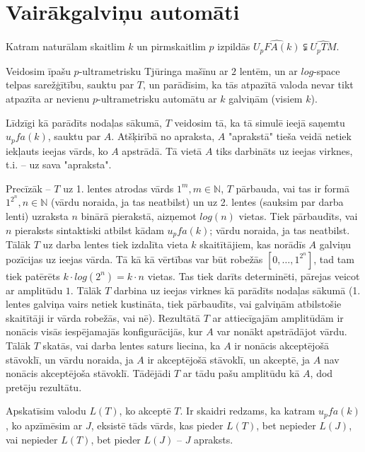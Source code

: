 \documentclass{ludis}
\begin{document}
\section{Vairākgalviņu automāti}
\begin{teorema} \label{atdalisana}
Katram naturālam skaitlim $k$ un pirmskaitlim $p$ izpildās $\widehat{U_pFA(k)} \subsetneqq \widehat{U_pTM}$.
\end{teorema}
\begin{pieradijums}
Veidosim īpašu $p$-ultrametrisku Tjūringa mašīnu ar $2$ lentēm, un ar $log$-space telpas sarežģītību, sauktu par $T$, un parādīsim, ka tās atpazītā valoda nevar tikt atpazīta ar nevienu $p$-ultrametrisku automātu ar $k$ galviņām (visiem $k$).

Līdzīgi kā parādīts nodaļas sākumā, $T$ veidosim tā, ka tā simulē ieejā saņemtu $u_pfa(k)$, sauktu par $A$. Atšķirībā no apraksta, $A$ "aprakstā" tieša veidā netiek iekļauts ieejas vārds, ko $A$ apstrādā. Tā vietā $A$ tiks darbināts uz ieejas virknes, t.i. -- uz sava "apraksta".

Precīzāk -- $T$ uz 1. lentes atrodas vārds $1^m, m \in \mathbb{N}$, $T$ pārbauda, vai tas ir formā $1^{2^n}, n \in \mathbb{N}$ (vārdu noraida, ja tas neatbilst) un uz 2. lentes (sauksim par darba lenti) uzraksta $n$ binārā pierakstā, aizņemot $log(n)$ vietas. Tiek pārbaudīts, vai $n$ pieraksts sintaktiski atbilst kādam $u_pfa(k)$; vārdu noraida, ja tas neatbilst. Tālāk $T$ uz darba lentes tiek izdalīta vieta $k$ skaitītājiem, kas norādīs $A$ galviņu pozīcijas uz ieejas vārda. Tā kā kā vērtības var būt robežās $\left[0, \ldots, 1^{2^n} \right]$, tad tam tiek patērēts $k \cdot log(2^n)= k \cdot n$ vietas. %
Tas tiek darīts determinēti, pārejas veicot ar amplitūdu $1$. Tālāk $T$ darbina uz ieejas virknes kā parādīts nodaļas sākumā (1. lentes galviņa vairs netiek kustināta, tiek pārbaudīts, vai galviņām atbilstošie skaitītāji ir vārda robežās, vai nē). Rezultātā $T$ ar attiecīgajām amplitūdām ir nonācis visās iespējamajās konfigurācijās, kur $A$ var nonākt apstrādājot vārdu. Tālāk $T$ skatās, vai darba lentes saturs liecina, ka $A$ ir nonācis akceptējošā stāvoklī, un vārdu noraida, ja $A$ ir akceptējošā stāvoklī, un akceptē, ja $A$ nav nonācis akceptējoša stāvoklī. Tādējādi $T$ ar tādu pašu amplitūdu kā $A$, dod pretēju rezultātu.

Apskatīsim valodu $L(T)$, ko akceptē $T$. Ir skaidri redzams, ka katram $u_pfa(k)$, ko apzīmēsim ar $J$, eksistē tāds vārds, kas pieder $L(T)$, bet nepieder $L(J)$, vai nepieder $L(T)$, bet pieder $L(J)$ -- $J$ apraksts.
\end{pieradijums}
\end{document}
